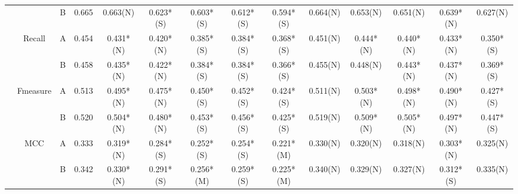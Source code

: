 \begin{table*}
{\begin{tabular}{|c|c|c|c|c|c|c|c|c|c|c|c|c|c|}
                      &                            & B                                                                             & 0.665         & 0.663(N)             & 0.623*(S)        & 0.603*(S)       & 0.612*(S)       & 0.594*(S)         & 0.664(N)        & 0.653(N)       & 0.651(N)       & 0.639*(N)        & 0.627(N)      \\ \cline{2-14} 
                      & \multirow{2}{*}{Recall}    & A                                                                             & 0.454         & 0.431*(N)            & 0.420*(N)         & 0.385*(S)       & 0.384*(S)       & 0.368*(S)         & 0.451(N)        & 0.444*(N)      & 0.440*(N)       & 0.433*(N)        & 0.350*(S)      \\ \cline{3-14} 
                      &                            & B                                                                             & 0.458         & 0.435*(N)            & 0.422*(N)        & 0.384*(S)       & 0.384*(S)       & 0.366*(S)         & 0.455(N)        & 0.448(N)       & 0.443*(N)      & 0.437*(N)        & 0.369*(S)     \\ \cline{2-14} 
                      & \multirow{2}{*}{Fmeasure}  & A                                                                             & 0.513         & 0.495*(N)            & 0.475*(N)        & 0.450*(S)        & 0.452*(S)       & 0.424*(S)         & 0.511(N)        & 0.503*(N)      & 0.498*(N)      & 0.490*(N)         & 0.427*(S)     \\ \cline{3-14} 
                      &                            & B                                                                             & 0.520          & 0.504*(N)            & 0.480*(N)         & 0.453*(S)       & 0.456*(S)       & 0.425*(S)         & 0.519(N)        & 0.509*(N)      & 0.505*(N)      & 0.497*(N)        & 0.447*(S)     \\ \cline{2-14} 
                      & \multirow{2}{*}{MCC}       & A                                                                             & 0.333         & 0.319*(N)            & 0.284*(S)        & 0.252*(S)       & 0.254*(S)       & 0.221*(M)         & 0.330(N)         & 0.320(N)        & 0.318(N)       & 0.303*(N)        & 0.325(N)      \\ \cline{3-14} 
                      &                            & B                                                                             & 0.342         & 0.330*(N)             & 0.291*(S)        & 0.256*(M)       & 0.259*(S)       & 0.225*(M)         & 0.340(N)         & 0.329(N)       & 0.327(N)       & 0.312*(S)        & 0.335(N)      \\ \hline
\end{tabular}%
}
\end{table*}